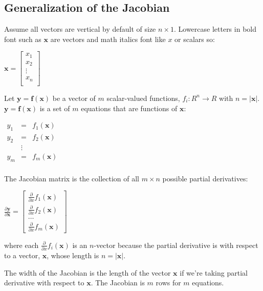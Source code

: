 \documentclass[11pt]{article}
\begin{document}
\subsection{Generalization of the Jacobian}

Assume all vectors are vertical by default of size $n \times 1$. Lowercase letters in bold font such as $\mathbf{x}$ are vectors and math italics font like $x$ or scalars so:

$\mathbf{x} = \begin{bmatrix}
           x_1\\
           x_2\\
           \vdots \\
           x_n\\
           \end{bmatrix}$

Let $\mathbf{y} = \mathbf{f}(\mathbf{x})$ be a vector of $m$ scalar-valued functions, $f_i : R^n \rightarrow R$ with $n=|\mathbf{x}|$. $\mathbf{y} = \mathbf{f}(\mathbf{x})$ is a set of $m$ equations that are functions of $\mathbf{x}$:

$
\begin{array}{lcl}
y_1 & = & f_1(\mathbf{x})\\
y_2 & = & f_2(\mathbf{x})\\
 & \vdots & \\
y_m & = & f_m(\mathbf{x})\\
\end{array}
$

The Jacobian matrix is the collection of all $m \times n$ possible partial derivatives:

$
\frac{\partial \mathbf{y}}{\partial \mathbf{x}} = \begin{bmatrix}
\frac{\partial}{\partial {x}} f_1(\mathbf{x}) \\
\frac{\partial}{\partial {x}} f_2(\mathbf{x})\\
\ldots\\
\frac{\partial}{\partial {x}} f_m(\mathbf{x})
\end{bmatrix}
$

where each $\frac{\partial}{\partial {x}} f_i(\mathbf{x})$ is an $n$-vector because the partial derivative is with respect to a vector, $\mathbf{x}$, whose length is $n = |\mathbf{x}|$.

The width of the Jacobian is the length of the vector $\mathbf{x}$ if we're taking partial derivative with respect to $\mathbf{x}$.  The Jacobian is $m$ rows for $m$ equations.
\end{document}

